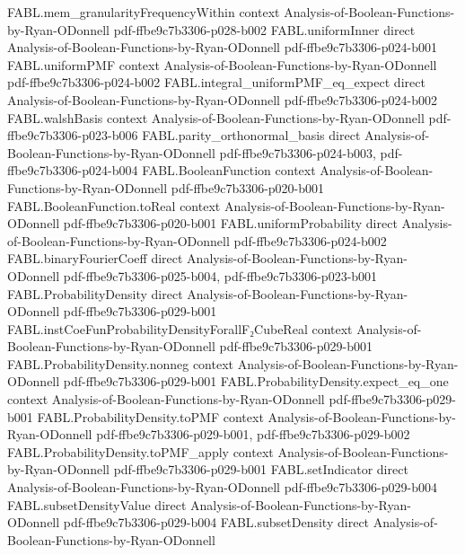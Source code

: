 \begin{theorem}
\proofstep
  {FABL.mem_granularityFrequencyWithin}
  {context}
  {Analysis-of-Boolean-Functions-by-Ryan-ODonnell}
  {pdf-ffbe9c7b3306-p028-b002}
\proofstep
  {FABL.uniformInner}
  {direct}
  {Analysis-of-Boolean-Functions-by-Ryan-ODonnell}
  {pdf-ffbe9c7b3306-p024-b001}
\proofstep
  {FABL.uniformPMF}
  {context}
  {Analysis-of-Boolean-Functions-by-Ryan-ODonnell}
  {pdf-ffbe9c7b3306-p024-b002}
\proofstep
  {FABL.integral_uniformPMF_eq_expect}
  {direct}
  {Analysis-of-Boolean-Functions-by-Ryan-ODonnell}
  {pdf-ffbe9c7b3306-p024-b002}
\proofstep
  {FABL.walshBasis}
  {context}
  {Analysis-of-Boolean-Functions-by-Ryan-ODonnell}
  {pdf-ffbe9c7b3306-p023-b006}
\proofstep
  {FABL.parity_orthonormal_basis}
  {direct}
  {Analysis-of-Boolean-Functions-by-Ryan-ODonnell}
  {pdf-ffbe9c7b3306-p024-b003,
    pdf-ffbe9c7b3306-p024-b004}
\proofstep
  {FABL.BooleanFunction}
  {context}
  {Analysis-of-Boolean-Functions-by-Ryan-ODonnell}
  {pdf-ffbe9c7b3306-p020-b001}
\proofstep
  {FABL.BooleanFunction.toReal}
  {context}
  {Analysis-of-Boolean-Functions-by-Ryan-ODonnell}
  {pdf-ffbe9c7b3306-p020-b001}
\proofstep
  {FABL.uniformProbability}
  {direct}
  {Analysis-of-Boolean-Functions-by-Ryan-ODonnell}
  {pdf-ffbe9c7b3306-p024-b002}
\proofstep
  {FABL.binaryFourierCoeff}
  {direct}
  {Analysis-of-Boolean-Functions-by-Ryan-ODonnell}
  {pdf-ffbe9c7b3306-p025-b004,
    pdf-ffbe9c7b3306-p023-b001}
\proofstep
  {FABL.ProbabilityDensity}
  {direct}
  {Analysis-of-Boolean-Functions-by-Ryan-ODonnell}
  {pdf-ffbe9c7b3306-p029-b001}
\proofstep
  {FABL.instCoeFunProbabilityDensityForallF₂CubeReal}
  {context}
  {Analysis-of-Boolean-Functions-by-Ryan-ODonnell}
  {pdf-ffbe9c7b3306-p029-b001}
\proofstep
  {FABL.ProbabilityDensity.nonneg}
  {context}
  {Analysis-of-Boolean-Functions-by-Ryan-ODonnell}
  {pdf-ffbe9c7b3306-p029-b001}
\proofstep
  {FABL.ProbabilityDensity.expect_eq_one}
  {context}
  {Analysis-of-Boolean-Functions-by-Ryan-ODonnell}
  {pdf-ffbe9c7b3306-p029-b001}
\proofstep
  {FABL.ProbabilityDensity.toPMF}
  {context}
  {Analysis-of-Boolean-Functions-by-Ryan-ODonnell}
  {pdf-ffbe9c7b3306-p029-b001,
    pdf-ffbe9c7b3306-p029-b002}
\proofstep
  {FABL.ProbabilityDensity.toPMF_apply}
  {context}
  {Analysis-of-Boolean-Functions-by-Ryan-ODonnell}
  {pdf-ffbe9c7b3306-p029-b001}
\proofstep
  {FABL.setIndicator}
  {direct}
  {Analysis-of-Boolean-Functions-by-Ryan-ODonnell}
  {pdf-ffbe9c7b3306-p029-b004}
\proofstep
  {FABL.subsetDensityValue}
  {direct}
  {Analysis-of-Boolean-Functions-by-Ryan-ODonnell}
  {pdf-ffbe9c7b3306-p029-b004}
\proofstep
  {FABL.subsetDensity}
  {direct}
  {Analysis-of-Boolean-Functions-by-Ryan-ODonnell}

\end{theorem}
